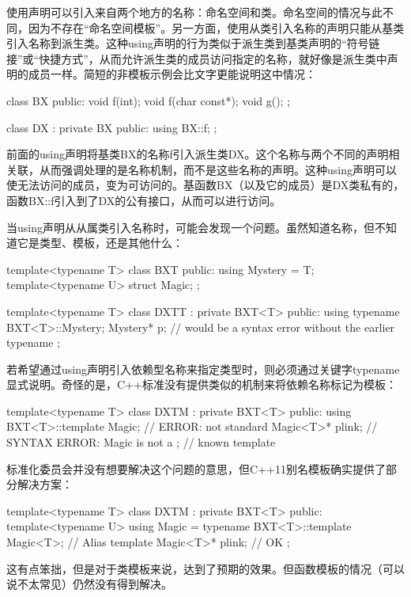 使用声明可以引入来自两个地方的名称：命名空间和类。命名空间的情况与此不同，因为不存在“命名空间模板”。另一方面，使用从类引入名称的声明只能从基类引入名称到派生类。这种using声明的行为类似于派生类到基类声明的“符号链接”或“快捷方式”，从而允许派生类的成员访问指定的名称，就好像是派生类中声明的成员一样。简短的非模板示例会比文字更能说明这中情况：

\begin{cpp}
class BX {
	public:
	void f(int);
	void f(char const*);
	void g();
};

class DX : private BX {
	public:
	using BX::f;
};
\end{cpp}

前面的using声明将基类BX的名称f引入派生类DX。这个名称与两个不同的声明相关联，从而强调处理的是名称机制，而不是这些名称的声明。这种using声明可以使无法访问的成员，变为可访问的。基函数BX（以及它的成员）是DX类私有的，函数BX::f引入到了DX的公有接口，从而可以进行访问。

当using声明从从属类引入名称时，可能会发现一个问题。虽然知道名称，但不知道它是类型、模板，还是其他什么：

\begin{cpp}
template<typename T>
class BXT {
	public:
	using Mystery = T;
	template<typename U>
	struct Magic;
};

template<typename T>
class DXTT : private BXT<T> {
	public:
	using typename BXT<T>::Mystery;
	Mystery* p; // would be a syntax error without the earlier typename
};
\end{cpp}

若希望通过using声明引入依赖型名称来指定类型时，则必须通过关键字typename显式说明。奇怪的是，C++标准没有提供类似的机制来将依赖名称标记为模板：

\begin{cpp}
template<typename T>
class DXTM : private BXT<T> {
	public:
	using BXT<T>::template Magic; // ERROR: not standard
	Magic<T>* plink; // SYNTAX ERROR: Magic is not a
}; // known template
\end{cpp}

标准化委员会并没有想要解决这个问题的意思，但C++11别名模板确实提供了部分解决方案：

\begin{cpp}
template<typename T>
class DXTM : private BXT<T> {
	public:
	template<typename U>
		using Magic = typename BXT<T>::template Magic<T>; // Alias template
	Magic<T>* plink; // OK
};
\end{cpp}

这有点笨拙，但是对于类模板来说，达到了预期的效果。但函数模板的情况（可以说不太常见）仍然没有得到解决。

